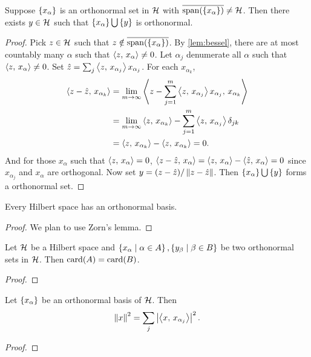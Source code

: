 \begin{lemma}
    Suppose $\left\{ {x_\alpha} \right\}$ is an orthonormal set in $\mathcal{H}$ with 
    $\overline{\operatorname{span}(\left\{ {x_\alpha} \right\})}\neq\mathcal{H}$. Then there exists 
    $y\in\mathcal{H}$ such that $\left\{ {x_\alpha} \right\}\bigcup\left\{ {y} \right\}$ is orthonormal.
\end{lemma}
\begin{proof}
    Pick $z\in\mathcal{H}$ such that $z\notin\overline{\operatorname{span}(\left\{ {x_\alpha} \right\})}$. 
    By \cref{lem:bessel}, there are at most countably many $\alpha$ 
    such that $\left\langle {z},\, {x_\alpha} \right\rangle\neq 0$. Let $\alpha_j$ denumerate all 
    $\alpha$ such that $\left\langle {z},\, {x_\alpha} \right\rangle\neq 0$. Set $\hat{z} 
    = \sum_j \left\langle {z},\, {x_{\alpha_j}} \right\rangle x_{\alpha_j}$. For each $x_{\alpha_k}$, 
    \begin{equation*}
        \begin{split}
            \left\langle {z-\hat{z}},\, {x_{\alpha_k}} \right\rangle 
            &= \lim_{m\to\infty} \left\langle {z-\sum_{j=1}^{m}\left\langle {z},\, {x_{\alpha_j}} \right\rangle x_{\alpha_j}},\, {x_{\alpha_k}} \right\rangle \\
            &= \lim_{m\to\infty} \left\langle {z},\, {x_{\alpha_k}} \right\rangle - \sum_{j=1}^{m} \left\langle {z},\, {x_{\alpha_j}} \right\rangle\delta_{jk} \\
            &= \left\langle {z},\, {x_{\alpha_k}} \right\rangle - \left\langle {z},\, {x_{\alpha_k}} \right\rangle = 0.
        \end{split}
    \end{equation*}
    And for those $x_\alpha$ such that $\left\langle {z},\, {x_\alpha} \right\rangle = 0$, 
    $\left\langle {z-\hat{z}},\, {x_\alpha} \right\rangle = \left\langle {z},\, {x_\alpha} \right\rangle - \left\langle {\hat{z}},\, {x_\alpha} \right\rangle = 0$ 
    since $x_{\alpha_j}$ and $x_\alpha$ are orthogonal. Now set 
    $y = (z - \hat{z})/\left\lVert {z - \hat{z}} \right\rVert$. Then $\left\{ {x_\alpha} \right\}\bigcup\left\{ {y} \right\}$ 
    forms a orthonormal set.
\end{proof}

\begin{theorem}
    Every Hilbert space has an orthonormal basis.
\end{theorem}
\begin{proof}
    We plan to use Zorn's lemma. 
\end{proof}

\begin{proposition}
    Let $\mathcal{H}$ be a Hilbert space and $\left\{ x_\alpha \;\middle\vert\; \alpha\in A \right\},\left\{ y_\beta \;\middle\vert\; \beta\in B \right\}$ 
    be two orthonormal sets in $\mathcal{H}$. Then $\operatorname{card}(A) = \operatorname{card}(B)$.
\end{proposition}
\begin{proof}
    
\end{proof}

\begin{proposition}
    Let $\left\{ {x_\alpha} \right\}$ be an orthonormal basis of $\mathcal{H}$. Then 
    \begin{equation*}
        \left\lVert {x} \right\rVert^2 = \sum_j\left\lvert {\left\langle {x},\, {x_{\alpha_j}} \right\rangle} \right\rvert^2.
    \end{equation*}
\end{proposition}
\begin{proof}
    
\end{proof}